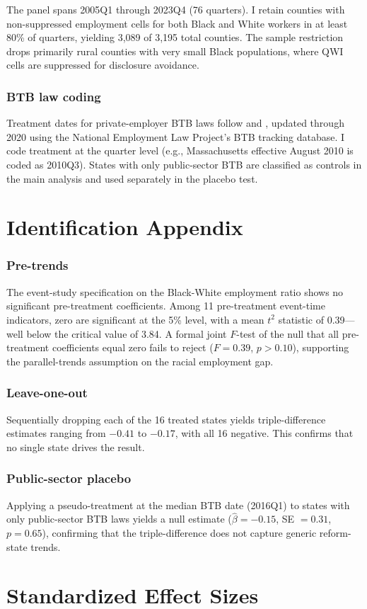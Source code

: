 \documentclass[12pt]{article}
\begin{document}
The panel spans 2005Q1 through 2023Q4 (76 quarters). I retain counties with non-suppressed employment cells for both Black and White workers in at least 80\% of quarters, yielding 3,089 of 3,195 total counties. The sample restriction drops primarily rural counties with very small Black populations, where QWI cells are suppressed for disclosure avoidance.

\subsubsection*{BTB law coding} Treatment dates for private-employer BTB laws follow \citet{doleac2020} and \citet{avery2019}, updated through 2020 using the National Employment Law Project's BTB tracking database. I code treatment at the quarter level (e.g., Massachusetts effective August 2010 is coded as 2010Q3). States with only public-sector BTB are classified as controls in the main analysis and used separately in the placebo test.

\section{Identification Appendix}

\subsubsection*{Pre-trends} The event-study specification on the Black-White employment ratio shows no significant pre-treatment coefficients. Among 11 pre-treatment event-time indicators, zero are significant at the 5\% level, with a mean $t^2$ statistic of 0.39---well below the critical value of 3.84. A formal joint $F$-test of the null that all pre-treatment coefficients equal zero fails to reject ($F = 0.39$, $p > 0.10$), supporting the parallel-trends assumption on the racial employment gap.

\subsubsection*{Leave-one-out} Sequentially dropping each of the 16 treated states yields triple-difference estimates ranging from $-0.41$ to $-0.17$, with all 16 negative. This confirms that no single state drives the result.

\subsubsection*{Public-sector placebo} Applying a pseudo-treatment at the median BTB date (2016Q1) to states with only public-sector BTB laws yields a null estimate ($\hat{\beta} = -0.15$, SE $= 0.31$, $p = 0.65$), confirming that the triple-difference does not capture generic reform-state trends.

\section{Standardized Effect Sizes}
\label{sec:sde}


\end{document}
